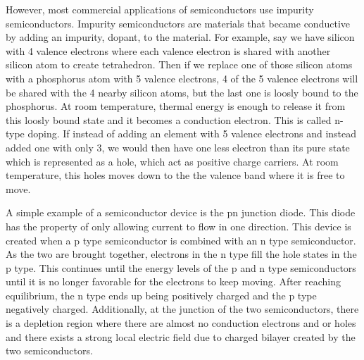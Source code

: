 \documentclass[ notitlepage, numerical, 11pt]{revtex4-1} %
\begin{document}
However, most commercial applications of semiconductors use impurity semiconductors. Impurity semiconductors are materials that became conductive by adding an impurity, dopant, to the material. For example, say we have silicon with 4 valence electrons where each valence electron is shared with another silicon atom to create tetrahedron. Then if we replace one of those silicon atoms with a phosphorus atom with 5 valence electrons, 4 of the 5 valence electrons will be shared with the 4 nearby silicon atoms, but the last one is loosly bound to the phosphorus. At room temperature, thermal energy is enough to release it from this loosly bound state and it becomes a conduction electron. This is called n-type doping. If instead of adding an element with 5 valence electrons and instead added one with only 3, we would then have one less electron than its pure state which is represented as a hole, which act as positive charge carriers. At room temperature, this holes moves down to the the valence band where it is free to move.

A simple example of a semiconductor device is the pn junction diode. This diode has the property of only allowing current to flow in one direction. This device is created when a p type semiconductor is combined with an n type semiconductor. As the two are brought together, electrons in the n type fill the hole states  in the p type. This continues until the energy levels of the p and n type semiconductors until it is no longer favorable for the electrons to keep moving. After reaching equilibrium, the n type ends up being positively charged and the p type negatively charged. Additionally, at the junction of the two semiconductors, there is a depletion region where there are almost no conduction electrons and or holes and there exists a strong local electric field due to charged bilayer created by the two semiconductors. 
\end{document}
